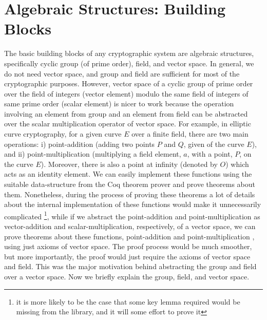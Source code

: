 \section{Algebraic Structures: Building Blocks}
\label{sec:algebra}
The basic building blocks of any cryptographic system are algebraic structures, specifically cyclic group (of prime order), field, and vector space. In general, 
we do not need vector space, and group and field are sufficient for most of the cryptographic purposes. However,
vector space  of a cyclic group of prime order over the field of integers (vector element) modulo the same field of integers of same prime order (scalar element)
is nicer to work because the operation involving an element from group and an element from field can be abstracted over 
the scalar multiplication operator of vector space.   For example,  in elliptic curve cryptography,  for a given curve $E$ over a finite field,   
there are two main operations: i) point-addition (adding two points $P$ and $Q$, given of the curve $E$),  and ii) point-multiplication (multiplying a field element, 
$a$, with a point, $P$, on the curve $E$).  Moreover,  there is also a point at infinity (denoted by $O$) which acts as an identity element.   
We can easily implement these functions using the suitable data-structure from the Coq theorem prover and prove theorems about them.  
Nonetheless,  during the process of proving these theorems a lot of details about 
the internal implementation of these functions would make it unnecessarily complicated \footnote{it is more likely to be the case that some key lemma required would be missing from the library,  
and it will some effort to prove it}, while if we abstract the point-addition and   point-multiplication as  vector-addition and scalar-multiplication, respectively, 
of a vector space, we can prove theorems about these functions,   point-addition and  point-multiplication , using just axioms of vector space.  
The proof process would be much smoother,  but more importantly, the proof would just require the axioms of vector space and field.
This was the major motivation behind abstracting the group and field over a vector space.  Now we briefly explain the group, field, and vector space. 

